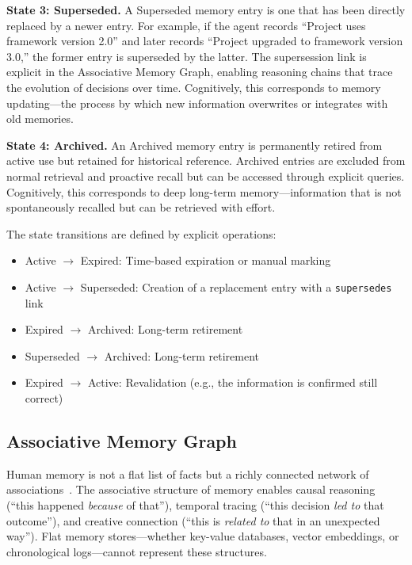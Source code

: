 \documentclass[11pt]{article}
\begin{document}
\textbf{State 3: Superseded.} A Superseded memory entry is one that has been directly replaced by a newer entry. For example, if the agent records ``Project uses framework version 2.0'' and later records ``Project upgraded to framework version 3.0,'' the former entry is superseded by the latter. The supersession link is explicit in the Associative Memory Graph, enabling reasoning chains that trace the evolution of decisions over time. Cognitively, this corresponds to memory updating---the process by which new information overwrites or integrates with old memories.

\textbf{State 4: Archived.} An Archived memory entry is permanently retired from active use but retained for historical reference. Archived entries are excluded from normal retrieval and proactive recall but can be accessed through explicit queries. Cognitively, this corresponds to deep long-term memory---information that is not spontaneously recalled but can be retrieved with effort.

The state transitions are defined by explicit operations:

\begin{itemize}
    \item Active $\rightarrow$ Expired: Time-based expiration or manual marking
    \item Active $\rightarrow$ Superseded: Creation of a replacement entry with a \texttt{supersedes} link
    \item Expired $\rightarrow$ Archived: Long-term retirement
    \item Superseded $\rightarrow$ Archived: Long-term retirement
    \item Expired $\rightarrow$ Active: Revalidation (e.g., the information is confirmed still correct)
\end{itemize}


\subsection{Associative Memory Graph}

Human memory is not a flat list of facts but a richly connected network of associations~\cite{anderson1973}. The associative structure of memory enables causal reasoning (``this happened \emph{because} of that''), temporal tracing (``this decision \emph{led to} that outcome''), and creative connection (``this is \emph{related to} that in an unexpected way''). Flat memory stores---whether key-value databases, vector embeddings, or chronological logs---cannot represent these structures.
\end{document}
